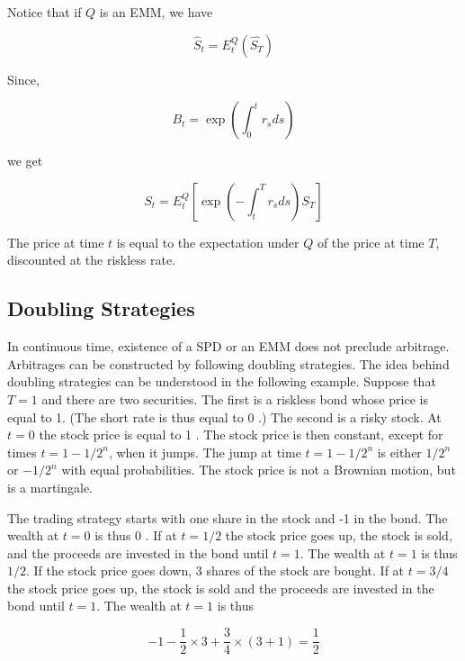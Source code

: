 \documentclass[\topdir/lecture\_notes.tex]{subfiles}
\begin{document}
Notice that if $Q$ is an EMM, we have

\begin{equation*}
\hat{S}_{t}=E_{t}^{Q}\left(\hat{S_{T}}\right)
\end{equation*}

Since,

\begin{equation*}
B_{t}=\exp \left(\int_{0}^{t} r_{s} d s\right)
\end{equation*}

we get

\begin{equation*}
S_{t}=E_{t}^{Q}\left[\exp \left(-\int_{t}^{T} r_{s} d s\right) S_{T}\right]
\end{equation*}

The price at time $t$ is equal to the expectation under $Q$ of the price at time $T$, discounted at the riskless rate.

\subsection{Doubling Strategies}
In continuous time, existence of a SPD or an EMM does not preclude arbitrage. Arbitrages can be constructed by following doubling strategies. The idea behind doubling strategies can be understood in the following example. Suppose that $T=1$ and there are two securities. The first is a riskless bond whose price is equal to 1. (The short rate is thus equal to 0 .) The second is a risky stock. At $t=0$ the stock price is equal to 1 . The stock price is then constant, except for times $t=1-1 / 2^{n}$, when it jumps. The jump at time $t=1-1 / 2^{n}$ is either $1 / 2^{n}$ or $-1 / 2^{n}$ with equal probabilities. The stock price is not a Brownian motion, but is a martingale.

The trading strategy starts with one share in the stock and -1 in the bond. The wealth at $t=0$ is thus 0 . If at $t=1 / 2$ the stock price goes up, the stock is sold, and the proceeds are invested in the bond until $t=1$. The wealth at $t=1$ is thus $1 / 2$. If the stock price goes down, 3 shares of the stock are bought. If at $t=3 / 4$ the stock price goes up, the stock is sold and the proceeds are invested in the bond until $t=1$. The wealth at $t=1$ is thus

\begin{equation*}
-1-\frac{1}{2} \times 3+\frac{3}{4} \times(3+1)=\frac{1}{2}
\end{equation*}
\end{document}
